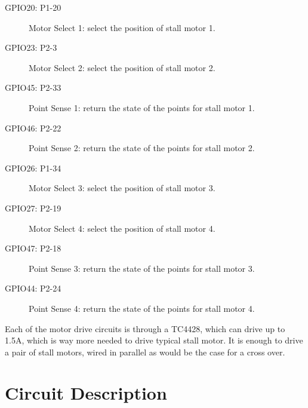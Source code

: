 \begin{description}
\item[GPIO20: P1-20] Motor Select 1: select the position of stall motor 
1. 
\item[GPIO23: P2-3] Motor Select 2: select the position of stall motor 
2. 
\item[GPIO45: P2-33] Point Sense 1: return the state of the points for 
stall motor 1. 
\item[GPIO46: P2-22] Point Sense 2: return the state of the points for 
stall motor 2. 
\item[GPIO26: P1-34] Motor Select 3: select the position of stall motor 
3. 
\item[GPIO27: P2-19] Motor Select 4: select the position of stall motor 
4. 
\item[GPIO47: P2-18] Point Sense 3: return the state of the points for 
stall motor 3. 
\item[GPIO44: P2-24] Point Sense 4: return the state of the points for 
stall motor 4. 
\end{description}

Each of the motor drive circuits is through a TC4428, which can drive up to
1.5A, which is way more needed to drive typical stall motor. It is enough to
drive a pair of stall motors, wired in parallel as would be the case for a
cross over. 

\section{Circuit Description}

